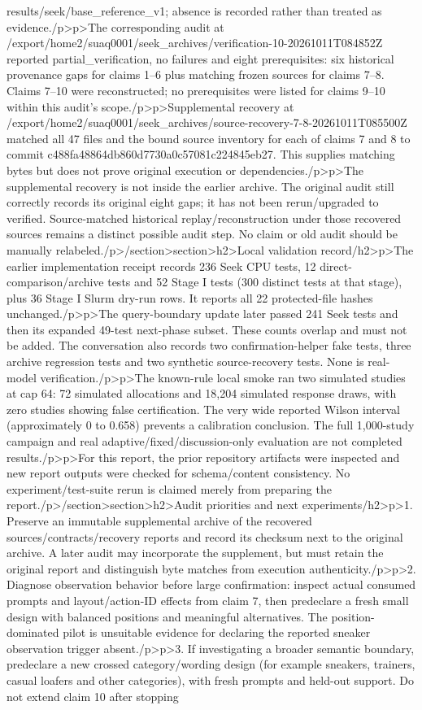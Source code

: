 results/seek/base_reference_v1; absence is recorded rather than treated as evidence.\</p>\<p>The corresponding audit at /export/home2/suaq0001/seek_archives/verification-10-20261011T084852Z reported partial_verification, no failures and eight prerequisites: six historical provenance gaps for claims 1–6 plus matching frozen sources for claims 7–8. Claims 7–10 were reconstructed; no prerequisites were listed for claims 9–10 within this audit’s scope.\</p>\<p>Supplemental recovery at /export/home2/suaq0001/seek_archives/source-recovery-7-8-20261011T085500Z matched all 47 files and the bound source inventory for each of claims 7 and 8 to commit c488fa48864db860d7730a0c57081c224845eb27. This supplies matching bytes but does not prove original execution or dependencies.\</p>\<p>The supplemental recovery is not inside the earlier archive. The original audit still correctly records its original eight gaps; it has not been rerun/upgraded to verified. Source-matched historical replay/reconstruction under those recovered sources remains a distinct possible audit step. No claim or old audit should be manually relabeled.\</p>\</section>\<section>\<h2>Local validation record\</h2>\<p>The earlier implementation receipt records 236 Seek CPU tests, 12 direct-comparison/archive tests and 52 Stage I tests (300 distinct tests at that stage), plus 36 Stage I Slurm dry-run rows. It reports all 22 protected-file hashes unchanged.\</p>\<p>The query-boundary update later passed 241 Seek tests and then its expanded 49-test next-phase subset. These counts overlap and must not be added. The conversation also records two confirmation-helper fake tests, three archive regression tests and two synthetic source-recovery tests. None is real-model verification.\</p>\<p>The known-rule local smoke ran two simulated studies at cap 64: 72 simulated allocations and 18,204 simulated response draws, with zero studies showing false certification. The very wide reported Wilson interval (approximately 0 to 0.658) prevents a calibration conclusion. The full 1,000-study campaign and real adaptive/fixed/discussion-only evaluation are not completed results.\</p>\<p>For this report, the prior repository artifacts were inspected and new report outputs were checked for schema/content consistency. No experiment/test-suite rerun is claimed merely from preparing the report.\</p>\</section>\<section>\<h2>Audit priorities and next experiments\</h2>\<p>1. Preserve an immutable supplemental archive of the recovered sources/contracts/recovery reports and record its checksum next to the original archive. A later audit may incorporate the supplement, but must retain the original report and distinguish byte matches from execution authenticity.\</p>\<p>2. Diagnose observation behavior before large confirmation: inspect actual consumed prompts and layout/action-ID effects from claim 7, then predeclare a fresh small design with balanced positions and meaningful alternatives. The position-dominated pilot is unsuitable evidence for declaring the reported sneaker observation trigger absent.\</p>\<p>3. If investigating a broader semantic boundary, predeclare a new crossed category/wording design (for example sneakers, trainers, casual loafers and other categories), with fresh prompts and held-out support. Do not extend claim 10 after stopping 